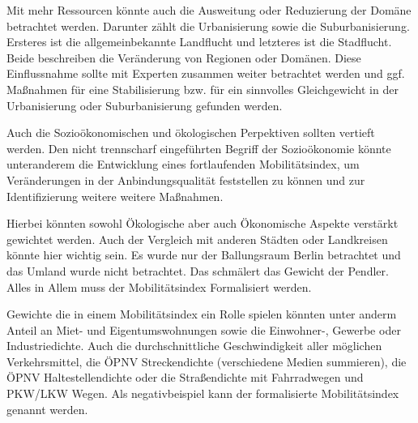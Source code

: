 Mit mehr Ressourcen könnte auch die Ausweitung oder Reduzierung der Domäne betrachtet werden. Darunter zählt die Urbanisierung sowie die Suburbanisierung.
Ersteres ist die allgemeinbekannte Landflucht und letzteres ist die Stadflucht. Beide beschreiben die Veränderung von Regionen oder Domänen. 
Diese Einflussnahme sollte mit Experten zusammen weiter betrachtet werden und ggf. Maßnahmen für eine Stabilisierung bzw. für ein sinnvolles Gleichgewicht in der Urbanisierung oder Suburbanisierung gefunden werden.

Auch die Sozioökonomischen und ökologischen Perpektiven sollten vertieft werden. 
Den nicht trennscharf eingeführten Begriff der Sozioökonomie könnte unteranderem die Entwicklung eines fortlaufenden Mobilitätsindex, um Veränderungen in der Anbindungsqualität feststellen zu können und zur Identifizierung weitere weitere Maßnahmen.


Hierbei könnten sowohl Ökologische aber auch Ökonomische Aspekte verstärkt gewichtet werden. %
Auch der Vergleich mit anderen Städten oder Landkreisen könnte hier wichtig sein. Es wurde nur der Ballungsraum Berlin betrachtet und das Umland wurde nicht betrachtet. Das schmälert das Gewicht der Pendler. Alles in Allem muss der Mobilitätsindex Formalisiert werden. 

Gewichte die in einem Mobilitätsindex ein Rolle spielen könnten unter anderm Anteil an Miet- und Eigentumswohnungen sowie die Einwohner-, 
Gewerbe oder Industriedichte. Auch die durchschnittliche Geschwindigkeit aller möglichen Verkehrsmittel, 
die ÖPNV Streckendichte (verschiedene Medien summieren), die ÖPNV Haltestellendichte oder die Straßendichte mit Fahrradwegen und PKW/LKW Wegen.
Als negativbeispiel kann der formalisierte Mobilitätsindex genannt werden.




